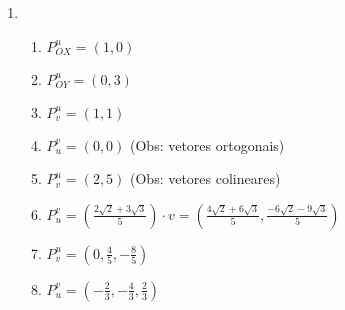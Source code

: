 \documentclass[a4paper]{article}
\begin{document}
\begin{enumerate}
\item 
  \begin{enumerate}
  \item $P^{u}_{OX}=(1,0)$
  \item $P^{u}_{OY}=(0,3)$
  \item $P^{u}_{v}=(1,1)$
  \item $P^{v}_{u}=(0,0)$ (Obs: vetores ortogonais)
  \item $P^{u}_{v}=(2,5)$ (Obs: vetores colineares)
  \item $P^{v}_{u}=(\frac{2\sqrt{2} + 3\sqrt{3}}{5}) \cdot v =
    (\frac{4\sqrt{2} + 6\sqrt{3}}{5}, \frac{-6\sqrt{2} - 9\sqrt{3}}{5} )$
  \item $P^{u}_{v}=(0,\frac{4}{5}, - \frac{8}{5})$
  \item $P^{v}_{u}=(-\frac{2}{3},-\frac{4}{3},\frac{2}{3})$
  \end{enumerate}

\end{enumerate}
\end{document}

